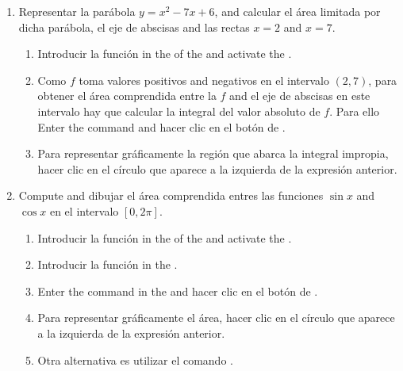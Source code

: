 \begin{enumerate}[leftmargin=*]
\item Representar la parábola $y=x^{2}-7x+6$, and calcular el área limitada por dicha parábola, el eje de abscisas and las rectas $x=2$ and $x=7$.
      \begin{indication}
      \begin{enumerate}
      \item Introducir la función  in the  of the   and activate the .
      \item Como $f$ toma valores positivos and negativos en el intervalo $(2,7)$, para obtener el área comprendida entre la $f$ and el eje de abscisas en este intervalo hay que calcular la integral del valor absoluto de $f$.
            Para ello Enter the command  and hacer clic en el botón de .
      \item Para representar gráficamente la región que abarca la integral impropia, hacer clic en el círculo que aparece a la izquierda de la expresión anterior.
      \end{enumerate}
      \end{indication}


\item Compute and dibujar el área comprendida entres las funciones $\sin x$ and $\cos x$ en el intervalo $[0,2\pi]$.
      \begin{indication}
      \begin{enumerate}
      \item Introducir la función  in the  of the   and activate the .
      \item Introducir la función  in the .
      \item Enter the command  in the  and hacer clic en el botón de .
      \item Para representar gráficamente el área, hacer clic en el círculo que aparece a la izquierda de la expresión anterior.
      \item Otra alternativa es utilizar el comando .
      \end{enumerate}
      \end{indication}



\end{enumerate}
